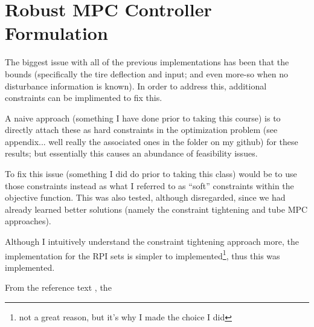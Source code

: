 \documentclass[onecolumn]{IEEEtran}
\begin{document}
\newpage
\section{Robust MPC Controller Formulation}
The biggest issue with all of the previous implementations has been that the bounds (specifically the tire deflection and input; and even more-so when no disturbance information is known).
In order to address this, additional constraints can be implimented to fix this.

A naive approach (something I have done prior to taking this course) is to directly attach these as hard constraints in the optimization problem (see appendix... well really the associated ones in the folder on my github) for these results; but essentially this causes an abundance of feasibility issues.

To fix this issue (something I did do prior to taking this class) would be to use those constraints instead as what I referred to as ``soft'' constraints within the objective function.
This was also tested, although disregarded, since we had already learned better solutions (namely the constraint tightening and tube MPC approaches).

Although I intuitively understand the constraint tightening approach more, the implementation for the RPI sets is simpler to implemented\footnote{not a great reason, but it's why I made the choice I did}, thus this was implemented.

From the reference text \cite{MAYNE2005219}, the 













\newpage
\appendix
\end{document}
